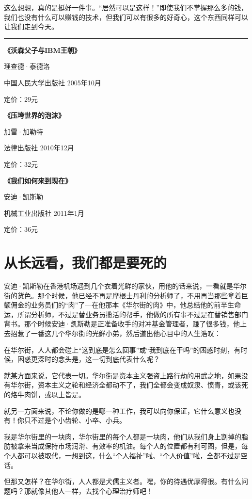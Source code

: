 这么想想，真的是挺好一件事。``居然可以是这样！''即使我们不掌握那么多的钱，我们也没有什么可以赚钱的技术，但我们可以有很多的好奇心，这个东西同样可以让我们走到今天。

\begin{center}\rule{3in}{0.4pt}\end{center}

\textbf{《沃森父子与IBM王朝》}

理查德·泰德洛

中国人民大学出版社 2005年10月

定价：29元

\textbf{《压垮世界的泡沫》}

加雷·加勒特

法律出版社 2010年12月

定价：32元

\textbf{《我们如何来到现在》}

安迪·凯斯勒

机械工业出版社 2011年1月

定价：36元

\section{从长远看，我们都是要死的}

安迪·凯斯勒在香港机场遇到几个衣着光鲜的家伙，用他的话来说，一看就是华尔街的货色。那个时候，他已经不再是摩根士丹利的分析师了，不用再当那些拿着巨额佣金的业务员们的``肉''了---在他那本《华尔街的肉》中，他总结他的前半生命运，所谓分析师，不过是替业务员揽活的帮手，他做的所有事不过是在替销售部门背书。那个时候安迪·凯斯勒是正准备收手的对冲基金管理者，赚了很多钱，他上去招惹了一番这几个华尔街的光鲜小弟，然后道出他心目中的人生浩叹：

在华尔街，人人都会碰上``这到底是怎么回事''或``我到底在干吗''的困惑时刻，有时候，困惑更深时的念头是，这一切到底代表什么呢？

就某方面来说，它代表一切。华尔街是资本主义强盗上路行劫的用武之地，如果没有华尔街，资本主义之轮和经济全都动不了，我们全都会变成奴隶、愤青，或该死的烙牛肉饼，或以上皆是。

就另一方面来说，不论你做的是哪一种工作，我可以向你保证，它什么意义也没有！你只不过是个小齿轮、小卒、小兵。

我是华尔街里的一块肉，华尔街里的每个人都是一块肉，他们从我们身上割掉的脂肪被拿来当成保持市场润滑、有效率的机油。每个人的位置都有利可图，但是，每个人都可以被取代，一想到这，什么``个人福祉''啦、``个人价值''啦，全都不过是空话。

但那又怎样？在华尔街，人人都是犬儒主义者。嘿，你的待遇优厚得很。有什么问题吗？那就像其他人一样，去找个心理治疗师吧！

